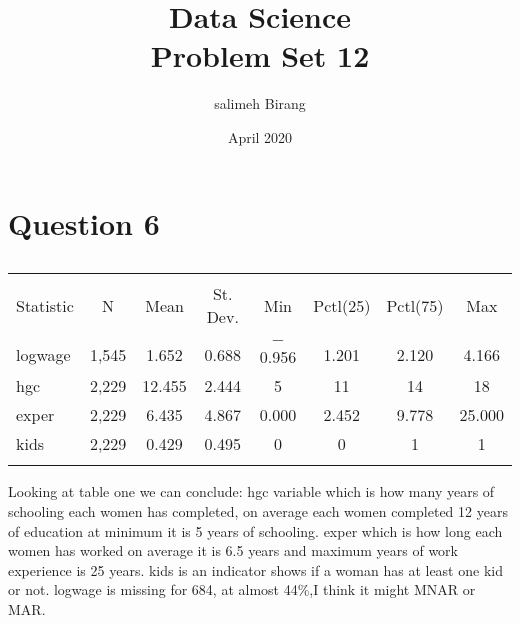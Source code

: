 \documentclass{article}
\title{Data Science\\Problem Set 12}
\author{salimeh Birang }
\date{April 2020}
\begin{document}
\maketitle

\section*{Question 6}

\begin{table}[!htbp] \centering 
  \caption{} 
  \label{} 
\begin{tabular}{@{\extracolsep{5pt}}lccccccc} 
\\[-1.8ex]\hline 
\hline \\[-1.8ex] 
Statistic & \multicolumn{1}{c}{N} & \multicolumn{1}{c}{Mean} & \multicolumn{1}{c}{St. Dev.} & \multicolumn{1}{c}{Min} & \multicolumn{1}{c}{Pctl(25)} & \multicolumn{1}{c}{Pctl(75)} & \multicolumn{1}{c}{Max} \\ 
\hline \\[-1.8ex] 
logwage & 1,545 & 1.652 & 0.688 & $-$0.956 & 1.201 & 2.120 & 4.166 \\ 
hgc & 2,229 & 12.455 & 2.444 & 5 & 11 & 14 & 18 \\ 
exper & 2,229 & 6.435 & 4.867 & 0.000 & 2.452 & 9.778 & 25.000 \\ 
kids & 2,229 & 0.429 & 0.495 & 0 & 0 & 1 & 1 \\ 
\hline \\[-1.8ex] 
\end{tabular} 
\end{table} 
Looking at table one we can conclude: hgc variable which is how many years of schooling each women has completed, on average each women completed 12 years of education at minimum it is 5 years of schooling. exper which is how long each women has worked on average it is 6.5 years and maximum years of work experience is 25 years.  kids is an indicator shows if a woman has at least one kid or not. logwage is missing for 684, at almost 44\%,I think it might MNAR or MAR.




\newpage
\end{document}

